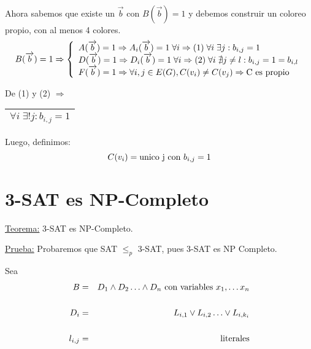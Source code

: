 \documentclass[12pt,a4paper]{report}
\newcounter{neq}
\begin{document}
				\par Ahora sabemos que existe un $\overrightarrow{b}$ con $B(\overrightarrow{b}) = 1$ y debemos construir un coloreo propio, con al menos 4 colores.
				\begin{equation*}
					B(\overrightarrow{b}) = 1\Rightarrow
		  			\left \lbrace
		  			\begin{array}{l}
		    		 A(\overrightarrow{b}) = 1 \Rightarrow A_{i}(\overrightarrow{b}) = 1 \; \forall i \Rightarrow  (1) \; \forall i \; \exists j : b_{i, j}  = 1 \\
		     		 D(\overrightarrow{b}) = 1 \Rightarrow D_{i}(\overrightarrow{b}) = 1 \; \forall i \Rightarrow  (2) \;  \forall i \; \nexists j \neq l : b_{i, j}  = 1 = b_{i, l} \\
		     		 F(\overrightarrow{b}) = 1 \Rightarrow \forall i, j \in E(G), C(v_{i}) \neq C(v_{j}) \Rightarrow \textup{C es propio}
		  			\end{array}
		  			\right.
				\end{equation*}
				\par De (1) y (2) $\Rightarrow$ \begin{tabular}{|c|} \hline $\forall i \; \exists ! j : b_{i, j} = 1$ \\ \hline \end{tabular}

				\vspace{3mm}
				\par Luego, definimos:
				\[ C(v_{i}) = \textup{unico j con } b_{i, j} = 1\]


	\section{3-SAT es NP-Completo}
		\underline{Teorema:} 3-SAT es NP-Completo.

		\vspace{3mm}
		\underline{Prueba:} Probaremos que SAT $\leq_{p}$ 3-SAT, pues 3-SAT es NP Completo.

		\vspace{3mm}
		Sea
		\begin{eqnarray}
			B &=& D_{1} \wedge D_{2} \dotsc \wedge D_{n} \textup{ con variables } x_{1}, \dotsc x_{n} \\
			\nonumber \\
			D_{i} &=& L_{i, 1} \vee L_{i, 2} \dotsc \vee L_{i, k_{i}} \\
			\nonumber \\
			l_{i, j} &=& \textup{literales}
		\end{eqnarray}
\end{document}
